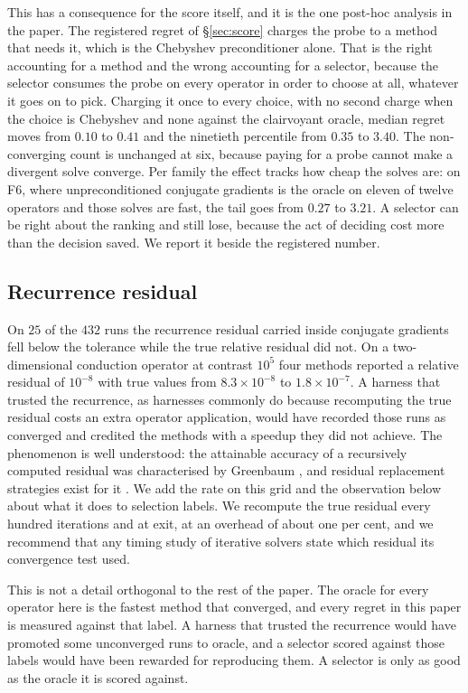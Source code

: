 \documentclass[11pt]{article}
\begin{document}
This has a consequence for the score itself, and it is the one post-hoc analysis
in the paper. The registered regret of \S\ref{sec:score} charges the probe to a
method that needs it, which is the Chebyshev preconditioner alone. That is the
right accounting for a method and the wrong accounting for a selector, because
the selector consumes the probe on every operator in order to choose at all,
whatever it goes on to pick. Charging it once to every choice, with no second
charge when the choice is Chebyshev and none against the clairvoyant oracle,
median regret moves from $0.10$ to $0.41$ and the ninetieth percentile from
$0.35$ to $3.40$. The non-converging count is unchanged at six, because paying
for a probe cannot make a divergent solve converge. Per family the effect tracks
how cheap the solves are: on F6, where unpreconditioned conjugate gradients is
the oracle on eleven of twelve operators and those solves are fast, the tail goes
from $0.27$ to $3.21$. A selector can be right about the ranking and still lose,
because the act of deciding cost more than the decision saved. We report it
beside the registered number.

\subsection{Recurrence residual}
\label{sec:false}

On $25$ of the $432$ runs the recurrence residual carried inside conjugate
gradients fell below the tolerance while the true relative residual did not. On a
two-dimensional conduction operator at contrast $10^{5}$ four methods reported a
relative residual of $10^{-8}$ with true values from $8.3\times10^{-8}$ to
$1.8\times10^{-7}$. A harness
that trusted the recurrence, as harnesses commonly do because recomputing the
true residual costs an extra operator application, would have recorded those runs
as converged and credited the methods with a speedup they did not achieve. The
phenomenon is well understood: the attainable accuracy of a recursively computed residual
was characterised by Greenbaum \cite{greenbaum}, and residual replacement strategies exist
for it \cite{vdvye}. We add the rate on this grid and the observation below about
what it does to selection labels. We
recompute the true residual every hundred iterations and at exit, at an overhead
of about one per cent, and we recommend that any timing study of iterative
solvers state which residual its convergence test used.

This is not a detail orthogonal to the rest of the paper. The oracle for every
operator here is the fastest method that converged, and every regret in this
paper is measured against that label. A harness that trusted the recurrence would
have promoted some unconverged runs to oracle, and a selector scored against
those labels would have been rewarded for reproducing them. A selector is only as
good as the oracle it is scored against.
\end{document}
